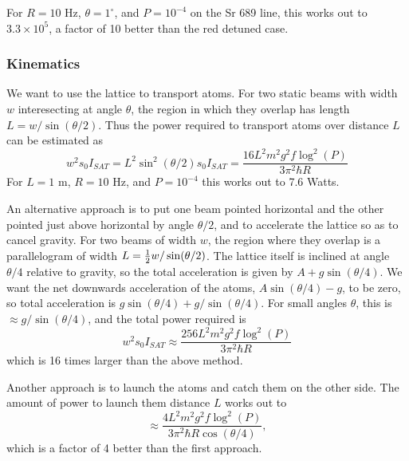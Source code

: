\documentclass[aps,twocolumn,prb,floatfix,amsmath,amssymb,groupedaddress]{revtex4}
\begin{document}
For $R=10$ Hz, $\theta=1^{\circ}$, and $P=10^{-4}$ on the Sr 689 line, this works out to $3.3 \times 10^5$, a factor of 10 better than the red detuned case.

\subsubsection{Kinematics}
We want to use the lattice to transport atoms.  For two static beams with width $w$ interesecting at angle $\theta$, the region in which they overlap has length $L = w/\sin(\theta/2)$.  Thus the power required to transport atoms over distance $L$ can be estimated as \[w^2 s_0 I_{SAT} = L^2 \sin^2(\theta/2) s_0 I_{SAT} = \frac{16 L^2 m^2g^2 f \log^2(P)}{3\pi^2\hbar R}\]
For $L=1$ m, $R=10$ Hz, and $P=10^{-4}$ this works out to 7.6 Watts.

An alternative approach is to put one beam pointed horizontal and the other pointed just above horizontal by angle $\theta/2$, and to accelerate the lattice so as to cancel gravity.  For two beams of width $w$, the region where they overlap is a parallelogram of width $L = {\frac{1}{2}} w /\sin(\theta/2)$.  The lattice itself is inclined at angle $\theta/4$ relative to gravity, so the total acceleration is given by $A+g\sin(\theta/4)$.  We want the net downwards acceleration of the atoms, $A\sin(\theta/4)-g$, to be zero, so total acceleration is $g\sin(\theta/4) + g/\sin(\theta/4)$.  For small angles $\theta$, this is $\approx g/\sin(\theta/4)$, and the total power required is 
\[w^2 s_0 I_{SAT} \approx \frac{256 L^2 m^2g^2 f \log^2(P)}{3\pi^2\hbar R}\]
which is 16 times larger than the above method.

Another approach is to launch the atoms and catch them on the other side.  The amount of power to launch them distance $L$ works out to \[\approx \frac{4 L^2 m^2g^2 f \log^2(P)}{3\pi^2\hbar R \cos(\theta/4)},\] which is a factor of 4 better than the first approach.
\end{document}
